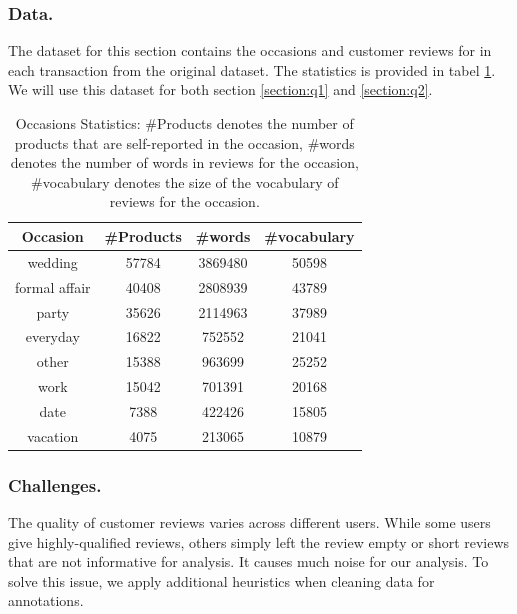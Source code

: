 \documentclass[sigconf]{acmart}
\begin{document}
\subsubsection{Data.} 
The dataset for this section contains the occasions and customer reviews for in each transaction from the original dataset. The statistics is provided in tabel \ref{table:occasion-statistics}. We will use this dataset for both section \ref{section:q1} and \ref{section:q2}.
\begin{table}[t]
\centering %

\begin{tabular}{cccc} %
\hline\hline %
Occasion & \#Products & #words & #vocabulary  \\ [0.5ex] %
\hline %
wedding & 57784 & 3869480 & 50598 \\ %
formal affair & 40408 & 2808939 & 43789\\
party & 35626 & 2114963 & 37989 \\
everyday & 16822 & 752552 & 21041\\
other & 15388 & 963699 & 25252 \\ 
work & 15042 & 701391 & 20168\\ 
date & 7388 & 422426 & 15805\\ 
vacation & 4075 & 213065 & 10879\\ 
[1ex] %
\hline %

\end{tabular}

\caption{Occasions Statistics: \#Products denotes the number of products that are self-reported in the occasion, \#words denotes the number of words in reviews for the occasion, \#vocabulary denotes the size of the vocabulary of reviews for the occasion.}
\label{table:occasion-statistics} %
\end{table}

\subsubsection{Challenges.}
The quality of customer reviews varies across different users. While some users give highly-qualified reviews, others simply left the review empty or short reviews that are not informative for analysis. It causes much noise for our analysis. To solve this issue, we apply additional heuristics when cleaning data for annotations.
\end{document}
